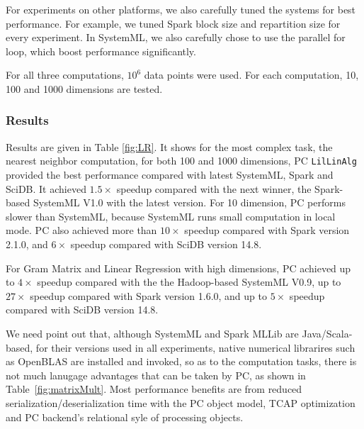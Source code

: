 For experiments on other platforms, we also carefully tuned the
systems for best performance. For example, we tuned Spark block size and repartition
size for every experiment. In SystemML, we also carefully chose to
use the parallel for loop, which boost performance significantly.

For
all three computations, 
$10^6$ data points were used. For each computation, 10, 100 and 1000
dimensions are tested.


\subsubsection {Results}

Results are given in 
Table \ref{fig:LR}. It shows for the most complex task, the nearest
neighbor computation, for both 100 and 1000 dimensions, PC
\texttt{LilLinAlg} provided the best performance compared with latest
SystemML, Spark and SciDB. It achieved $1.5\times$ speedup compared with
the next winner, the Spark-based
SystemML V1.0 with the latest version. For 10 dimension, PC performs slower
than SystemML, because SystemML runs small computation in local
mode. PC also achieved more than $10\times$ speedup compared with
Spark version 2.1.0, and $6\times$ speedup compared with SciDB version
14.8. 

For Gram Matrix and Linear Regression with high dimensions, PC achieved up to
$4\times$ speedup compared with the the Hadoop-based SystemML V0.9, up to $27\times$
speedup compared with Spark version 1.6.0, and up to $5\times$ speedup compared
with SciDB version 14.8.

We need point out that, although SystemML and Spark MLLib are
Java/Scala-based, for their versions used
in all experiments, native
numerical librarires such as OpenBLAS are installed and invoked, so as to
the computation tasks, there is not much lanugage advantages that can
be taken by PC, as shown in Table~\ref{fig:matrixMult}. Most performance benefits are from reduced
serialization/deserialization time with the PC object model, TCAP optimization and PC
backend's relational syle of processing objects.


